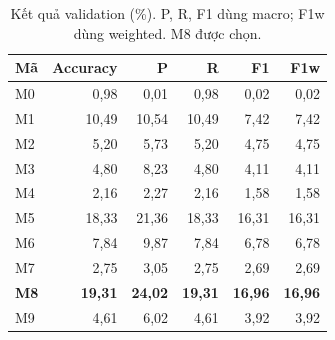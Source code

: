 \begin{table}[H]\centering\small
\caption{Kết quả validation (\%). P, R, F1 dùng macro; F1w dùng weighted. M8 được chọn.}
\begin{tabular}{lrrrrr}\toprule
Mã & Accuracy & P & R & F1 & F1w\\\midrule
M0 & 0,98 & 0,01 & 0,98 & 0,02 & 0,02\\
M1 & 10,49 & 10,54 & 10,49 & 7,42 & 7,42\\
M2 & 5,20 & 5,73 & 5,20 & 4,75 & 4,75\\
M3 & 4,80 & 8,23 & 4,80 & 4,11 & 4,11\\
M4 & 2,16 & 2,27 & 2,16 & 1,58 & 1,58\\
M5 & 18,33 & 21,36 & 18,33 & 16,31 & 16,31\\
M6 & 7,84 & 9,87 & 7,84 & 6,78 & 6,78\\
M7 & 2,75 & 3,05 & 2,75 & 2,69 & 2,69\\
\textbf{M8} & \textbf{19,31} & \textbf{24,02} & \textbf{19,31} & \textbf{16,96} & \textbf{16,96}\\
M9 & 4,61 & 6,02 & 4,61 & 3,92 & 3,92\\
\bottomrule\end{tabular}
\end{table}

